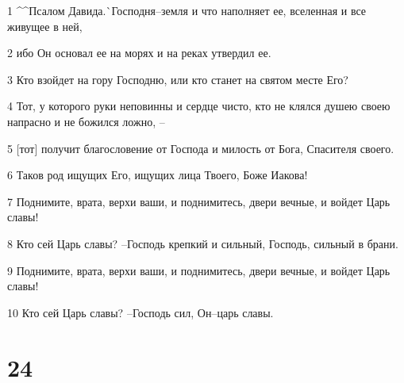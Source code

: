 \par 1 ^^Псалом Давида.^^ Господня--земля и что наполняет ее, вселенная и все живущее в ней,
\par 2 ибо Он основал ее на морях и на реках утвердил ее.
\par 3 Кто взойдет на гору Господню, или кто станет на святом месте Его?
\par 4 Тот, у которого руки неповинны и сердце чисто, кто не клялся душею своею напрасно и не божился ложно, --
\par 5 [тот] получит благословение от Господа и милость от Бога, Спасителя своего.
\par 6 Таков род ищущих Его, ищущих лица Твоего, Боже Иакова!
\par 7 Поднимите, врата, верхи ваши, и поднимитесь, двери вечные, и войдет Царь славы!
\par 8 Кто сей Царь славы? --Господь крепкий и сильный, Господь, сильный в брани.
\par 9 Поднимите, врата, верхи ваши, и поднимитесь, двери вечные, и войдет Царь славы!
\par 10 Кто сей Царь славы? --Господь сил, Он--царь славы.

\chapter{24}

